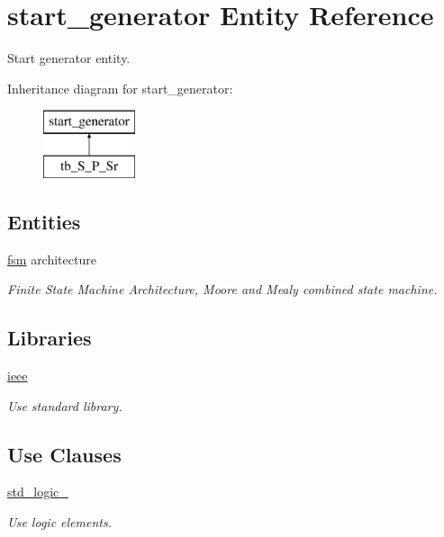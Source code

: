 \hypertarget{classstart__generator}{}\section{start\+\_\+generator Entity Reference}
\label{classstart__generator}


Start generator entity.  


Inheritance diagram for start\+\_\+generator\+:\begin{figure}[H]
\begin{center}
\leavevmode
\includegraphics[height=2.000000cm]{classstart__generator}
\end{center}
\end{figure}
\subsection*{Entities}
\begin{DoxyCompactItemize}
\item 
\hyperlink{classstart__generator_1_1fsm}{fsm} architecture
\begin{DoxyCompactList}\small\item\em Finite State Machine Architecture, Moore and Mealy combined state machine. \end{DoxyCompactList}\end{DoxyCompactItemize}
\subsection*{Libraries}
 \begin{DoxyCompactItemize}
\item 
\hyperlink{classstart__generator_a0a6af6eef40212dbaf130d57ce711256}{ieee} 
\begin{DoxyCompactList}\small\item\em Use standard library. \end{DoxyCompactList}\end{DoxyCompactItemize}
\subsection*{Use Clauses}
 \begin{DoxyCompactItemize}
\item 
\hyperlink{classstart__generator_acd03516902501cd1c7296a98e22c6fcb}{std\+\_\+logic\+\_}   
\begin{DoxyCompactList}\small\item\em Use logic elements. \end{DoxyCompactList}\end{DoxyCompactItemize}
